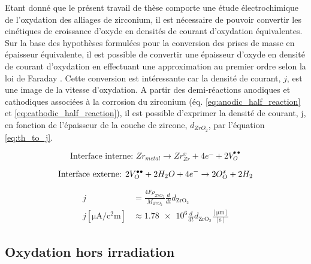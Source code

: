 \begin{refsection}
    Etant donné que le présent travail de thèse comporte une étude électrochimique de l'oxydation des alliages de zirconium, il est
    nécessaire de pouvoir convertir les cinétiques de croissance d'oxyde en densités de courant d'oxydation équivalentes.
    Sur la base des hypothèses formulées pour la conversion des prises de masse en épaisseur équivalente, il est
    possible de convertir une épaisseur d'oxyde en densité de courant
    d'oxydation en effectuant une approximation au premier ordre selon la loi de Faraday \citep{Bard2001}. Cette
    conversion est intéressante car la densité de courant, $j$, est une image de la vitesse d'oxydation.
    A partir des demi-réactions anodiques et cathodiques associées \citep{Adamson2007} à la corrosion du zirconium 
    (éq. \ref{eq:anodic_half_reaction} et \ref{eq:cathodic_half_reaction}),
    il est possible d'exprimer la densité de courant, j, en fonction de l'épaisseur de la
    couche de zircone, $d_{ZrO_2}$, par l'équation \ref{eq:th_to_j}. 



    \begin{equation}
        \text{Interface interne: }Zr_{metal} \rightarrow Zr_{Zr}^x + 4e^{-} + 2V_O^{\bullet \bullet}
        \label{eq:anodic_half_reaction}
    \end{equation}

    \begin{equation}
        \text{Interface externe: }2V_O^{\bullet \bullet} + 2 H_2O + 4e^{-}  \rightarrow 2O_O^x + 2H_2 \\
    \label{eq:cathodic_half_reaction}
    \end{equation}


    \begin{equation}
    \begin{split}
        \mathit{j} &= \frac{4F\rho _{ZrO_2}}{M_{ZrO_2}}\frac{d}{d\mathit{t}} \mathit{d_{\mathrm{ZrO_2}}}\\
        \mathit{j}[\si{\micro\ampere\per\square\centi\meter}] &\approx \num{1.78e6}
        \frac{d}{d\mathit{t}} \mathit{d_{\mathrm{ZrO_2}}} \frac{[\si{\micro\meter}]}{[\si{\second}]}
    \end{split}    
    \label{eq:th_to_j}
    \end{equation}


    \subsection{Oxydation hors irradiation}\label{subsec:no_irradiation}
    

\end{refsection}
